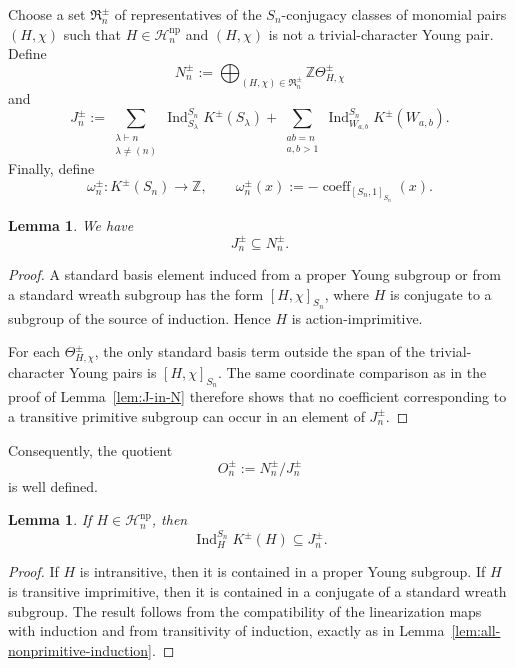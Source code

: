 \documentclass[a4paper,11pt]{article}
\numberwithin{equation}{section}
\newtheorem{lemma}[theorem]{Lemma}
\newcommand{\Z}{\mathbb{Z}}
\newcommand{\Ind}{\operatorname{Ind}}
\newcommand{\coeff}{\operatorname{coeff}}
\begin{document}
Choose a set $\mathfrak R_n^{\pm}$ of representatives of the
$S_n$-conjugacy classes of monomial pairs $(H,\chi)$ such that
$H\in\mathcal H_n^{\mathrm{np}}$ and $(H,\chi)$ is not a trivial-character
Young pair. Define
\[
  N_n^{\pm}
  :=
  \bigoplus_{(H,\chi)\in\mathfrak R_n^{\pm}}
  \Z\Theta_{H,\chi}^{\pm}
\]
and
\[
  J_n^{\pm}
  :=
  \sum_{\substack{\lambda\vdash n\\\lambda\ne(n)}}
  \Ind_{S_\lambda}^{S_n}K^{\pm}(S_\lambda)
  +
  \sum_{\substack{ab=n\\a,b>1}}
  \Ind_{W_{a,b}}^{S_n}K^{\pm}(W_{a,b}).
\]
Finally, define
\[
  \omega_n^{\pm}:K^{\pm}(S_n)\longrightarrow\Z,
  \qquad
  \omega_n^{\pm}(x)
  :=
  -\coeff_{[S_n,1]_{S_n}}(x).
\]

\begin{lemma}\label{lem:monomial-J-in-N}
We have
\[
  J_n^{\pm}\subseteq N_n^{\pm}.
\]
\end{lemma}

\begin{proof}
A standard basis element induced from a proper Young subgroup or from a
standard wreath subgroup has the form $[H,\chi]_{S_n}$, where $H$ is
conjugate to a subgroup of the source of induction. Hence $H$ is
action-imprimitive.

For each $\Theta_{H,\chi}^{\pm}$, the only standard basis term outside the
span of the trivial-character Young pairs is $[H,\chi]_{S_n}$. The same
coordinate comparison as in the proof of Lemma~\ref{lem:J-in-N} therefore
shows that no coefficient corresponding to a transitive primitive subgroup can
occur in an element of $J_n^{\pm}$.
\end{proof}

Consequently, the quotient
\[
  O_n^{\pm}:=N_n^{\pm}/J_n^{\pm}
\]
is well defined.

\begin{lemma}\label{lem:monomial-nonprimitive-induction}
If $H\in\mathcal H_n^{\mathrm{np}}$, then
\[
  \Ind_H^{S_n}K^{\pm}(H)\subseteq J_n^{\pm}.
\]
\end{lemma}

\begin{proof}
If $H$ is intransitive, then it is contained in a proper Young subgroup. If
$H$ is transitive imprimitive, then it is contained in a conjugate of a
standard wreath subgroup. The result follows from the compatibility of the
linearization maps with induction and from transitivity of
induction, exactly as in Lemma~\ref{lem:all-nonprimitive-induction}.
\end{proof}
\end{document}

